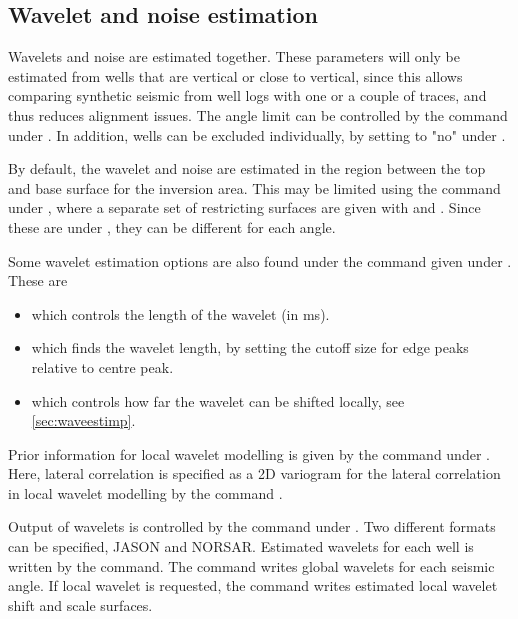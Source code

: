 \subsection{Wavelet and noise estimation}
Wavelets and noise are estimated together. These parameters will only
be estimated from wells that are vertical or close to vertical, since
this allows comparing synthetic seismic from well logs with one or a
couple of traces, and thus reduces alignment issues. The angle limit
can be controlled by the
 command
under . In addition, wells can be excluded individually,
by setting  to "no" under . 

By default, the wavelet and noise are estimated in the region between
the top and base surface for the inversion area. This may be limited
using the  command under 
, where a separate set of restricting surfaces are given
with  and . Since these are
under , they can be different for each angle. 

Some wavelet estimation options are also found under the command
 given under . These are 
\begin{itemize}
\item {} which controls the length of the wavelet (in ms).
\item {} which finds the wavelet
  length, by setting the cutoff size for edge peaks relative to centre
  peak. 
\item {} which controls how far the wavelet
  can be shifted locally, see \autoref{sec:waveestimp}. 
\end{itemize}

Prior information for local wavelet modelling is given by the
 command under . Here, lateral
correlation is specified as  a 2D variogram for the lateral
correlation in local wavelet modelling by the command
. 

Output of wavelets is controlled by the  command under . 
Two different formats can be specified, JASON and NORSAR. Estimated wavelets for each well is written by the 
 command. The command  
writes global wavelets for each seismic angle. If local wavelet is requested, the command 
 writes estimated local wavelet shift and scale surfaces.

